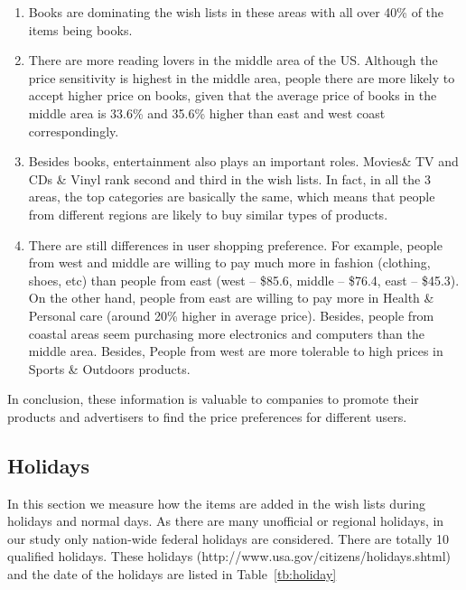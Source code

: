 \begin{enumerate}
\item Books are dominating the wish lists in these areas with all over 40\% of the items being books.

\item There are more reading lovers in the middle area of the US. Although the price sensitivity is highest in the middle area, people there are more likely to accept higher price on books, given that the average price of books in the middle area is 33.6\% and 35.6\% higher than east and west coast correspondingly. 

\item Besides books, entertainment also plays an important roles. Movies\& TV and CDs \& Vinyl rank second and third in the wish lists. In fact, in all the 3 areas, the top categories are basically the same, which means that people from different regions are likely to buy similar types of products. 

\item There are still differences in user shopping preference. For example, people from west and middle are willing to pay much more in fashion (clothing, shoes, etc) than people from east (west -- \$85.6, middle -- \$76.4, east -- \$45.3). On the other hand, people from east are willing to pay more in Health \& Personal care (around 20\% higher in average price). Besides, people from coastal areas seem purchasing more electronics and computers than the middle area. Besides, People from west are more tolerable to high prices in Sports \& Outdoors products. 

\end{enumerate}
In conclusion, these information is valuable to companies to promote their products and advertisers to find the price preferences for different users. 

\subsection{Holidays}
In this section we measure how the items are added in the wish lists during holidays and normal days. As there are many unofficial or regional holidays, in our study only nation-wide federal holidays are considered. There are totally 10 qualified holidays. These holidays (http://www.usa.gov/citizens/holidays.shtml) and the date of the holidays are listed in Table~\ref{tb:holiday}




